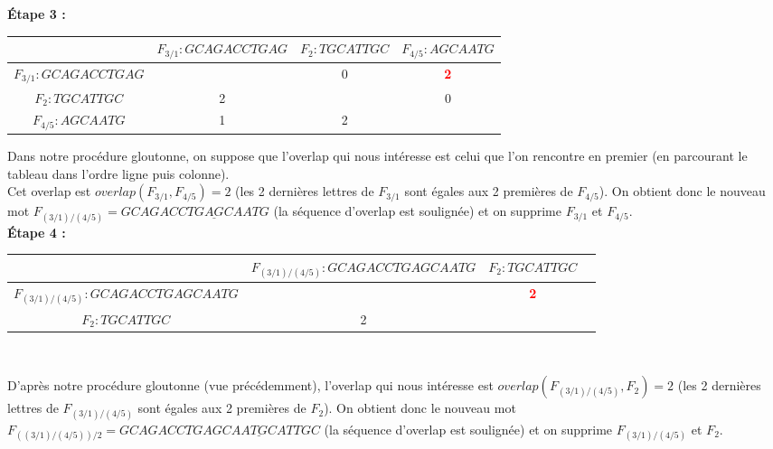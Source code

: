 \documentclass[11pt,letterpaper]{article}
\begin{document}
\textbf{Étape 3 :}\\

\begin{center}
\begin{tabular}{|*{4}{c|}}
    \hline
    & $F_{3/1} : GCAGACCTGAG$ & $F_2 : TGCATTGC$ & $F_{4/5} : AGCAATG$\\
    \hline
    $F_{3/1} : GCAGACCTGAG$ & & 0 & \textbf{\textcolor{red}{2}}\\
    \hline
    $F_2 : TGCATTGC$ & 2 & & 0\\
    \hline
    $F_{4/5} : AGCAATG$ & 1 & 2 &\\
    \hline
\end{tabular}
\end{center}

\vspace{5px}

Dans notre procédure gloutonne, on suppose que l'overlap qui nous intéresse est celui que l'on rencontre en premier (en parcourant le tableau dans l'ordre ligne puis colonne).\\

Cet overlap est $overlap(F_{3/1},F_{4/5}) = 2$ (les 2 dernières lettres de $F_{3/1}$ sont égales aux 2 premières de $F_{4/5}$). On obtient donc le nouveau mot $F_{(3/1)/(4/5)} = GCAGACCTG\underline{AG}CAATG$ (la séquence d'overlap est soulignée) et on supprime $F_{3/1}$ et $F_{4/5}$.\\

\textbf{Étape 4 :}\\

\begin{tabular}{|*{4}{c|}}
    \hline
    & $F_{(3/1)/(4/5)} : GCAGACCTGAGCAATG$ & $F_2 : TGCATTGC$\\
    \hline
    $F_{(3/1)/(4/5)} : GCAGACCTGAGCAATG$ & & \textbf{\textcolor{red}{2}}\\
    \hline
    $F_2 : TGCATTGC$ & 2 &\\
    \hline
\end{tabular}\\

\vspace{15px}

D'après notre procédure gloutonne (vue précédemment), l'overlap qui nous intéresse est $overlap(F_{(3/1)/(4/5)},F_2) = 2$ (les 2 dernières lettres de $F_{(3/1)/(4/5)}$ sont égales aux 2 premières de $F_2$). On obtient donc le nouveau mot $F_{((3/1)/(4/5))/2} = GCAGACCTGAGCAA\underline{TG}CATTGC$ (la séquence d'overlap est soulignée) et on supprime $F_{(3/1)/(4/5)}$ et $F_2$.\\
\end{document}
